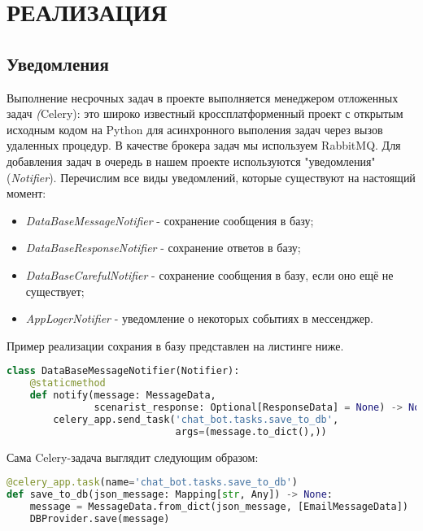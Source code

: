 \section{РЕАЛИЗАЦИЯ}
    \subsection{Уведомления}
    Выполнение несрочных задач в проекте выполняется менеджером отложенных задач \textit(Celery):
    это широко известный кроссплатформенный проект с открытым исходным кодом на Python для
    асинхронного выполения задач через вызов удаленных процедур. В качестве брокера задач мы используем RabbitMQ.
    Для добавления задач в очередь в нашем проекте используются "уведомления" (\textit{Notifier}).
    Перечислим все виды уведомлений, которые существуют на настоящий момент:
    \begin{itemize}
        \item \textit{DataBaseMessageNotifier} - сохранение сообщения в базу;
        \item \textit{DataBaseResponseNotifier} - сохранение ответов в базу;
        \item \textit{DataBaseCarefulNotifier} - сохранение сообщения в базу, если оно ещё не существует;
        \item \textit{AppLogerNotifier} - уведомление о некоторых событиях в мессенджер.
    \end{itemize}
    Пример реализации сохрания в базу представлен на листинге ниже.
\begin{lstlisting}[language=Python]
class DataBaseMessageNotifier(Notifier):
    @staticmethod
    def notify(message: MessageData,
               scenarist_response: Optional[ResponseData] = None) -> None:
        celery_app.send_task('chat_bot.tasks.save_to_db',
                             args=(message.to_dict(),))
\end{lstlisting}

    Сама Celery-задача выглядит следующим образом:
\begin{lstlisting}[language=Python]
@celery_app.task(name='chat_bot.tasks.save_to_db')
def save_to_db(json_message: Mapping[str, Any]) -> None:
    message = MessageData.from_dict(json_message, [EmailMessageData])
    DBProvider.save(message)
\end{lstlisting}

